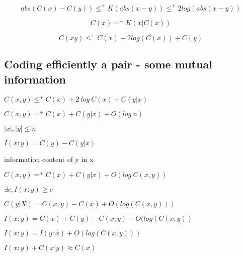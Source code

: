 \begin{theorem}
$$abs(C(x)-C(y)) \leqslant^+ K(abs(x-y)) \leqslant^+ 2log(abs(x-y))$$
\end{theorem}

\begin{theorem}
$$C(x) =^+ K(x|C(x))$$
\end{theorem}

\begin{corollary}
$$C(xy) \leqslant^+ C(x) + 2 log(C(x))+C(y)$$
\end{corollary}

\subsection{Coding efficiently a pair - some mutual information}

\begin{theorem}
$C(x,y)\leqslant^+ C(x) + 2~ log~C(x) + C(y|x)$
\end{theorem}

\begin{theorem}
$C(x,y)=^+ C(x) + C(y|x) +O(log~n)$
\par $|x|,|y| \leqslant n$
\end{theorem}

\begin{definition}
$I(x:y)=C(y)-C(y|x)$
\par information content of y in x
\end{definition}

\begin{theorem}
$C(x,y)=^+ C(x)+C(y|x)+O(log~C(x,y))$
\end{theorem}

\begin{theorem}
$\exists c, I(x:y) \geqslant c$
\end{theorem}

\begin{theorem}
$C(y|X) = C(x,y) - C(x) + O(log(C(x,y)))$
\end{theorem}

\begin{corollary}
$I(x:y) = C(x) + C(y) - C(x,y) + O(log(C(x,y))$
\end{corollary}

\begin{corollary}
$I(x:y) = I(y:x) + O(log(C(x,y)))$
\end{corollary}

\begin{theorem}
$I(x:y)+C(x|y) \approx C(x)$
\end{theorem}

